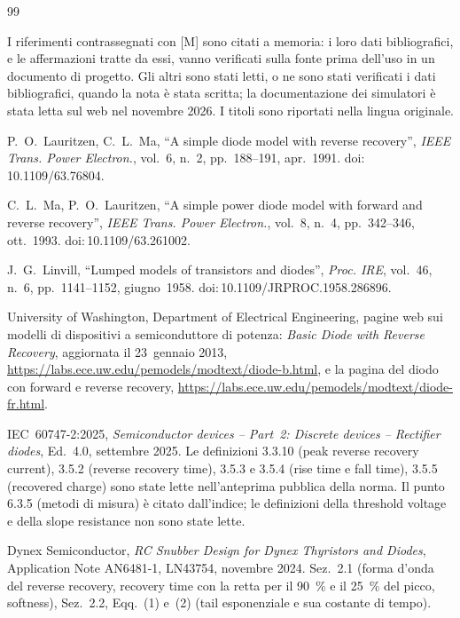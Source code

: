 \documentclass[10pt,a4paper]{scrartcl}
\begin{document}
\begin{thebibliography}{99}
\small
\item[] I riferimenti contrassegnati con [M] sono citati a memoria: i loro dati bibliografici, e le affermazioni tratte da essi, vanno verificati sulla fonte prima dell'uso in un documento di progetto. Gli altri sono stati letti, o ne sono stati verificati i dati bibliografici, quando la nota è stata scritta; la documentazione dei simulatori è stata letta sul web nel novembre 2026. I titoli sono riportati nella lingua originale.

P.~O.~Lauritzen, C.~L.~Ma, ``A simple diode model with reverse recovery'', \emph{IEEE Trans. Power Electron.}, vol.~6, n.~2, pp.~188--191, apr.~1991. doi:\,10.1109/63.76804.

C.~L.~Ma, P.~O.~Lauritzen, ``A simple power diode model with forward and reverse recovery'', \emph{IEEE Trans. Power Electron.}, vol.~8, n.~4, pp.~342--346, ott.~1993. doi:\,10.1109/63.261002.

J.~G.~Linvill, ``Lumped models of transistors and diodes'', \emph{Proc. IRE}, vol.~46, n.~6, pp.~1141--1152, giugno~1958. doi:\,10.1109/JRPROC.1958.286896.

University of Washington, Department of Electrical Engineering, pagine web sui modelli di dispositivi a semiconduttore di potenza: \emph{Basic Diode with Reverse Recovery}, aggiornata il 23~gennaio 2013, \url{https://labs.ece.uw.edu/pemodels/modtext/diode-b.html}, e la pagina del diodo con forward e reverse recovery, \url{https://labs.ece.uw.edu/pemodels/modtext/diode-fr.html}.

IEC~60747-2:2025, \emph{Semiconductor devices -- Part~2: Discrete devices -- Rectifier diodes}, Ed.~4.0, settembre 2025. Le definizioni 3.3.10 (peak reverse recovery current), 3.5.2 (reverse recovery time), 3.5.3 e 3.5.4 (rise time e fall time), 3.5.5 (recovered charge) sono state lette nell'anteprima pubblica della norma. Il punto 6.3.5 (metodi di misura) è citato dall'indice; le definizioni della threshold voltage e della slope resistance non sono state lette.

Dynex Semiconductor, \emph{RC Snubber Design for Dynex Thyristors and Diodes}, Application Note AN6481-1, LN43754, novembre 2024. Sez.~2.1 (forma d'onda del reverse recovery, recovery time con la retta per il \SI{90}{\percent} e il \SI{25}{\percent} del picco, softness), Sez.~2.2, Eqq.~(1) e~(2) (tail esponenziale e sua costante di tempo).


\end{thebibliography}
\end{document}
